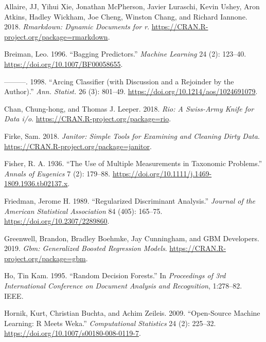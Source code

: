 \documentclass[
]{book}
\newlength{\cslhangindent}
\newenvironment{CSLReferences}[2] %
 {\begin{list}{}{%
  \setlength{\itemindent}{0pt}
  \setlength{\leftmargin}{0pt}
  \setlength{\parsep}{0pt}
  \ifodd #1
   \setlength{\leftmargin}{\cslhangindent}
   \setlength{\itemindent}{-1\cslhangindent}
  \fi
  \setlength{\itemsep}{#2\baselineskip}}}
 {\end{list}}
\theoremstyle{plain}
\theoremstyle{definition}
\theoremstyle{definition}
\theoremstyle{definition}
\theoremstyle{definition}
\theoremstyle{definition}
\theoremstyle{remark}
\begin{document}
\label{refs}
\begin{CSLReferences}{1}{0}
Allaire, JJ, Yihui Xie, Jonathan McPherson, Javier Luraschi, Kevin Ushey, Aron Atkins, Hadley Wickham, Joe Cheng, Winston Chang, and Richard Iannone. 2018. \emph{Rmarkdown: Dynamic Documents for r}. \url{https://CRAN.R-project.org/package=rmarkdown}.

Breiman, Leo. 1996. {``Bagging Predictors.''} \emph{Machine Learning} 24 (2): 123--40. \url{https://doi.org/10.1007/BF00058655}.

---------. 1998. {``Arcing Classifier (with Discussion and a Rejoinder by the Author).''} \emph{Ann. Statist.} 26 (3): 801--49. \url{https://doi.org/10.1214/aos/1024691079}.

Chan, Chung-hong, and Thomas J. Leeper. 2018. \emph{Rio: A Swiss-Army Knife for Data i/o}. \url{https://CRAN.R-project.org/package=rio}.

Firke, Sam. 2018. \emph{Janitor: Simple Tools for Examining and Cleaning Dirty Data}. \url{https://CRAN.R-project.org/package=janitor}.

Fisher, R. A. 1936. {``The {Use} of {Multiple Measurements} in {Taxonomic Problems}.''} \emph{Annals of Eugenics} 7 (2): 179--88. \url{https://doi.org/10.1111/j.1469-1809.1936.tb02137.x}.

Friedman, Jerome H. 1989. {``Regularized {Discriminant Analysis}.''} \emph{Journal of the American Statistical Association} 84 (405): 165--75. \url{https://doi.org/10.2307/2289860}.

Greenwell, Brandon, Bradley Boehmke, Jay Cunningham, and GBM Developers. 2019. \emph{Gbm: Generalized Boosted Regression Models}. \url{https://CRAN.R-project.org/package=gbm}.

Ho, Tin Kam. 1995. {``Random Decision Forests.''} In \emph{Proceedings of 3rd International Conference on Document Analysis and Recognition}, 1:278--82. {IEEE}.

Hornik, Kurt, Christian Buchta, and Achim Zeileis. 2009. {``Open-Source Machine Learning: {R} Meets {Weka}.''} \emph{Computational Statistics} 24 (2): 225--32. \url{https://doi.org/10.1007/s00180-008-0119-7}.


\end{CSLReferences}
\end{document}

